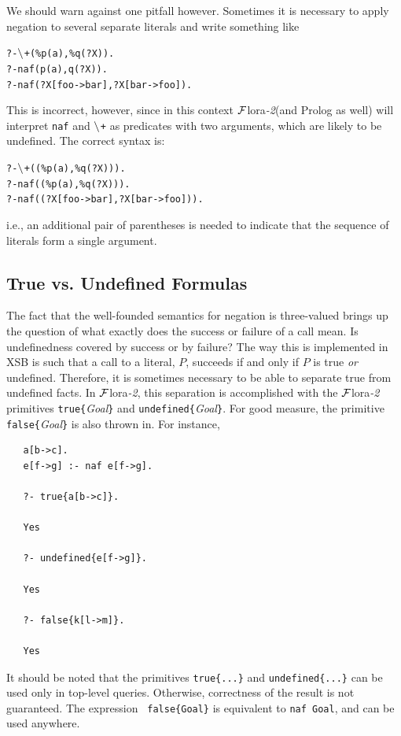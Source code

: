 \documentclass[11pt]{article}
\newcommand{\FLORA}{{\mbox{\sc ${\cal F}${lora}\rm\emph{-2}}}\xspace}
\newcommand{\PLGNAF}{\mbox{\tt \ensuremath{\tt\backslash}+}\xspace}
\newcommand{\SILKNAF}{{{\tt naf}}\xspace}
\begin{document}
We should warn against one pitfall however. Sometimes it is necessary to
apply negation to several separate literals and write something like
\begin{alltt}
       ?- \PLGNAF(\%p(a),\%q(?X)).
       ?- \SILKNAF(p(a),q(?X)).
       ?- \SILKNAF(?X[foo->bar], ?X[bar->foo]).
\end{alltt}
This is incorrect, however, since in this context \FLORA (and Prolog as
well) will interpret \SILKNAF and \PLGNAF as predicates with two arguments,
which are likely to be undefined. The correct syntax is:
\begin{alltt}
       ?- \PLGNAF((\%p(a),\%q(?X))).
       ?- \SILKNAF((\%p(a),\%q(?X))).
       ?- \SILKNAF((?X[foo->bar], ?X[bar->foo])).
\end{alltt}
i.e., an additional pair of parentheses is needed to indicate that
the sequence of literals form a single argument.

\subsection{True vs. Undefined Formulas}

The fact that the well-founded semantics for negation is three-valued
brings up the question of what exactly does the success or failure of a
call mean. Is undefinedness covered by success or by failure?  The way
this is implemented in XSB is such that a call to a literal, $P$, succeeds
if and only if $P$ is true \emph{or} undefined.  Therefore, it is sometimes
necessary to be able to separate true from undefined facts. In \FLORA, this
separation is accomplished with the \FLORA primitives
{\tt true\{}\emph{Goal}{\tt \}} and {\tt undefined\{}\emph{Goal}{\tt \}}.
For good measure, the primitive {\tt false\{}\emph{Goal}{\tt \}} is also
thrown in. For instance,
\begin{verbatim}
   a[b->c].
   e[f->g] :- naf e[f->g].

   ?- true{a[b->c]}.

   Yes

   ?- undefined{e[f->g]}.

   Yes

   ?- false{k[l->m]}.

   Yes
\end{verbatim}
It should be noted that the primitives {\tt true\{...\}}  and
{\tt undefined\{...\}} can be used only in top-level queries. Otherwise,
correctness of the result is not guaranteed. The expression {\tt
  false\{Goal\}} is equivalent to {\tt naf Goal},  and can be used
anywhere.
\end{document}

